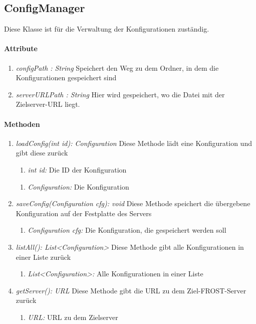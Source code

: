 
\subsection*{ConfigManager}\label{confman}
Diese Klasse ist für die Verwaltung der Konfigurationen zuständig.
\paragraph{Attribute}
\begin{enumerate}[-]
	\item \textit{configPath : String} Speichert den Weg zu dem Ordner, in dem die Konfigurationen gespeichert sind
	
	\item \textit{serverURLPath : String} Hier wird gespeichert, wo die Datei mit der Zielserver-URL liegt.		
\end{enumerate}

\paragraph{Methoden}
	
\begin{enumerate}[+]
	\item \textit{loadConfig(int id): Configuration} Diese Methode lädt eine Konfiguration und gibt diese zurück
		\begin{enumerate}[$\bullet$]
			\item \textit{int id:} Die ID der Konfiguration
		\end{enumerate}
		\vspace{-0.2cm}
		\begin{enumerate}[$\circ$]
			\item \textit{Configuration:} Die Konfiguration
		\end{enumerate}
	
	\item \textit{saveConfig(Configuration cfg): void} Diese Methode speichert die übergebene Konfiguration auf der Festplatte des Servers
	\begin{enumerate}[$\bullet$]
		\item \textit{Configuration cfg:} Die Konfiguration, die gespeichert werden soll
	\end{enumerate}
	
	\item \textit{listAll(): List<Configuration>} Diese Methode gibt alle Konfigurationen in einer Liste zurück	
	\begin{enumerate}[$\circ$]
		\item \textit{List<Configuration>:} Alle Konfigurationen in einer Liste
	\end{enumerate}
	
	\item \textit{getServer(): URL} Diese Methode gibt die URL zu dem Ziel-FROST-Server zurück
	\begin{enumerate}[$\circ$]
		\item \textit{URL:} URL zu dem Zielserver
	\end{enumerate}
\end{enumerate}